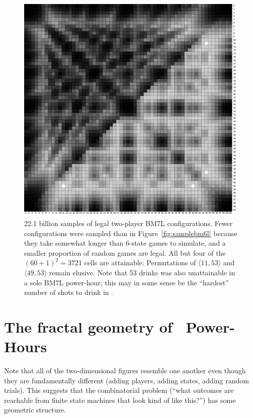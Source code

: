 \documentclass[twocolumn]{article}
\begin{document}
\begin{figure}
\begin{center}
\includegraphics[width=0.90 \linewidth]{sample60min2players7states.png}
\end{center}\vspace{-0.1in}
\caption{ 22.1 billion samples of legal two-player BM7L
  configurations. Fewer configurations were sampled than in
  Figure~\ref{fig:samplebm6l} because they take somewhat longer than
  6-state games to simulate, and a smaller proportion of random games
  are legal.
  All but four of the $(60 + 1)^2 = 3721$ cells are attainable: 
  Permutations of $\langle 11, 53 \rangle$ and $\langle 49, 53 \rangle$
  remain elusive. Note that 53 drinks was also unattainable in a solo
  BM7L power-hour; this may in some sense be the ``hardest'' number of
  shots to drink in \bmsl.
}
\label{fig:samplebm7l}
\end{figure}


\section{The fractal geometry of \kn\ Power-Hours}

Note that all of the two-dimensional figures resemble one another even
though they are fundamentally different (adding players, adding
states, adding random trials). This suggests that the combinatorial
problem (``what outcomes are reachable from finite state machines that
look kind of like this?'') has some geometric structure.
\end{document}
